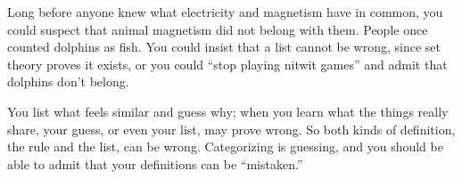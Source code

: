 Long before anyone knew what electricity and magnetism have in common, you could suspect that animal magnetism did not belong with them.  People once counted dolphins as fish. You could insist that a list cannot be wrong, since set theory proves it exists, or you could ``stop playing nitwit games'' and admit that dolphins don't belong. 

You list what feels similar and guess why; when you learn what the things really share, your guess, or even your list, may prove wrong. So both kinds of definition, the rule and the list, can be wrong. Categorizing is guessing, and you should be able to admit that your definitions can be ``mistaken.''
